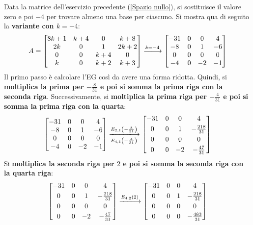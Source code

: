 \documentclass[a4paper]{article}
\makeatletter
\newenvironment{rowequmatbra}[1]{\left[\array{@{}#1@{}}}{\endarray\right]}
\makeatother
\begin{document}
	Data la matrice dell'esercizio precedente (\ref{Spazio nullo}), si sostituisce il valore zero e poi $-4$ per trovare almeno una base per ciascuno. Si mostra qua di seguito la \textbf{variante con $k = -4$}:
	\begin{equation*}
		A = \begin{bmatrix}
			8k+1	& k+4	& 0		& k+8 	\\
			2k 		& 0 	& 1 	& 2k+2 	\\
			0		& 0 	& k+4 	& 0 	\\
			k		& 0 	& k+2 	& k+3
		\end{bmatrix} \xlongrightarrow{k = -4}
		\begin{bmatrix}
			-31		& 0		& 0		& 4 	\\
			-8 		& 0 	& 1 	& -6 	\\
			0		& 0 	& 0 	& 0 	\\
			-4		& 0 	& -2 	& -1
		\end{bmatrix}
	\end{equation*}
	Il \textcolor{Red3}{primo passo} è calcolare l'EG così da avere una forma ridotta. Quindi, si \textbf{moltiplica la prima per $-\frac{8}{31}$ e poi si somma la prima riga con la seconda riga}. Successivamente, si \textbf{moltiplica la prima riga per $-\frac{4}{31}$ e poi si somma la prima riga con la quarta}:
	\begin{equation*}
		\begin{rowequmatbra}{cccc}
			-31		& 0		& 0		& 4 	\\
			-8 		& 0 	& 1 	& -6 	\\
			0		& 0 	& 0 	& 0 	\\
			-4		& 0 	& -2 	& -1
		\end{rowequmatbra} \xlongrightarrow[E_{4,1}\left(-\frac{4}{31}\right)]{E_{2,1}\left(-\frac{8}{31}\right)}
		\begin{rowequmatbra}{cccc}
			-31		& 0		& 0		& 4 				\\ [0.3em]
			0 		& 0 	& 1 	& -\frac{218}{31} 	\\ [0.3em]
			0		& 0 	& 0 	& 0 				\\ [0.3em]
			0		& 0 	& -2 	& -\frac{47}{31}
		\end{rowequmatbra}
	\end{equation*}
	Si \textbf{moltiplica la seconda riga per $2$ e poi si somma la seconda riga con la quarta riga}:
	\begin{equation*}
		\begin{rowequmatbra}{cccc}
			-31		& 0		& 0		& 4 				\\ [0.3em]
			0 		& 0 	& 1 	& -\frac{218}{31} 	\\ [0.3em]
			0		& 0 	& 0 	& 0 				\\ [0.3em]
			0		& 0 	& -2 	& -\frac{47}{31}
		\end{rowequmatbra} \xlongrightarrow{E_{4,2}\left(2\right)}
		\begin{rowequmatbra}{cccc}
			-31		& 0		& 0		& 4 				\\ [0.3em]
			0 		& 0 	& 1 	& -\frac{218}{31} 	\\ [0.3em]
			0		& 0 	& 0 	& 0 				\\ [0.3em]
			0		& 0 	& 0 	& -\frac{483}{31}
		\end{rowequmatbra}
	\end{equation*}
\end{document}
